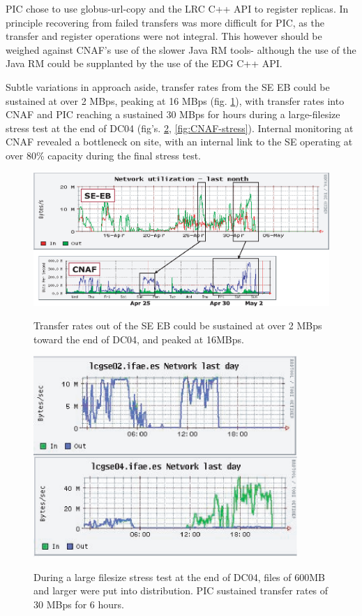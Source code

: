 \documentclass{cmspaper}
\begin{document}
PIC chose to use globus-url-copy and the LRC C++ API to register replicas. In principle recovering from failed transfers was more difficult for PIC, as the transfer and register operations were not integral. This however should be weighed against CNAF's use of the slower Java RM tools- although the use of the Java RM could be supplanted by the use of the EDG C++ API.

Subtle variations in approach aside, transfer rates from the SE EB could be sustained at over 2 MBps, peaking at 16 MBps (fig. \ref{fig:SE-EB-network}), with transfer rates into CNAF and PIC reaching a sustained 30 MBps for hours during a large-filesize stress test at the end of DC04 (fig's. \ref{fig:PIC-stress}, \ref{fig:CNAF-stress}). Internal monitoring at CNAF revealed a bottleneck on site, with an internal link to the SE operating at over 80\% capacity during the final stress test.

\begin{figure}[tbp]
\centering
\includegraphics[width=15cm]{SE-EB-network.eps}
\label{fig:SE-EB-network}
\caption{Transfer rates out of the SE EB could be sustained at over 2 MBps toward the end of DC04, and peaked at 16MBps.}
\end{figure}

\begin{figure}[tbp]
\centering
\includegraphics[width=10cm]{PIC-stress.eps}
\label{fig:PIC-stress}
\caption{During a large filesize stress test at the end of DC04, files of 600MB and larger were put into distribution. PIC sustained transfer rates of 30 MBps for 6 hours.}
\end{figure} 
\end{document}
